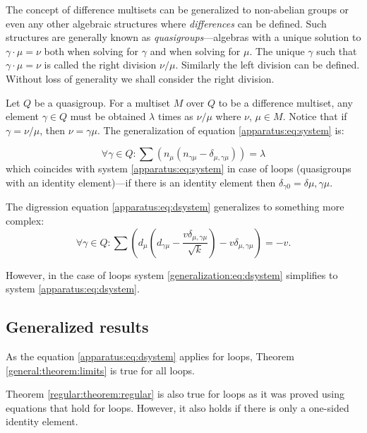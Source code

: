 The concept of difference multisets can be generalized to non-abelian groups or even any other algebraic structures where \emph{differences} can be defined. Such structures are generally known as \emph{quasigroups}---algebras with a unique solution to $\gamma\cdot\mu=\nu$ both when solving for $\gamma$ and when solving for $\mu$. The unique $\gamma$
such that $\gamma\cdot\mu=\nu$ is called the right division $\nu/\mu$. Similarly the left division can be defined.
Without loss of generality we shall consider the right division. 

Let $Q$ be a quasigroup. For a multiset $M$ over $Q$ to be a difference multiset, any element $\gamma\in Q$ must be obtained $\lambda$ times as $\nu/\mu$ where $\nu$, $\mu\in M$. Notice that if $\gamma=\nu/\mu$, then $\nu=\gamma\mu$. The generalization of equation \eqref{apparatus:eq:system} is:

    \begin{equation}
        \label{generalization:eq:system}
        \forall \gamma \in Q \colon \sum (n_\mu(n_{\gamma\mu}-\delta_{\mu,\gamma\mu})) = \lambda
    \end{equation}
which coincides with system \eqref{apparatus:eq:system} in case of loops (quasigroups with an identity element)---if there is an identity element then $\delta_{\gamma0}=\delta{\mu,\gamma\mu}$.

The digression equation \eqref{apparatus:eq:dsystem} generalizes to something more complex:
    \begin{equation}
        \label{generalization:eq:dsystem}
        \forall \gamma \in Q \colon \sum (d_\mu (d_{\gamma\mu}-\frac{v\delta_{\mu,\gamma\mu}}{\sqrt k})-v\delta_{\mu,\gamma\mu}) = -v.
    \end{equation}

However, in the case of loops system \eqref{generalization:eq:dsystem} simplifies to system \eqref{apparatus:eq:dsystem}.

\subsection{Generalized results}

As the equation \eqref{apparatus:eq:dsystem} applies for loops, Theorem \ref{general:theorem:limits} is true for all loops.

Theorem \ref{regular:theorem:regular} is also true for loops as it was proved using equations that hold for loops. However, it also holds if there is only a one-sided identity element.

